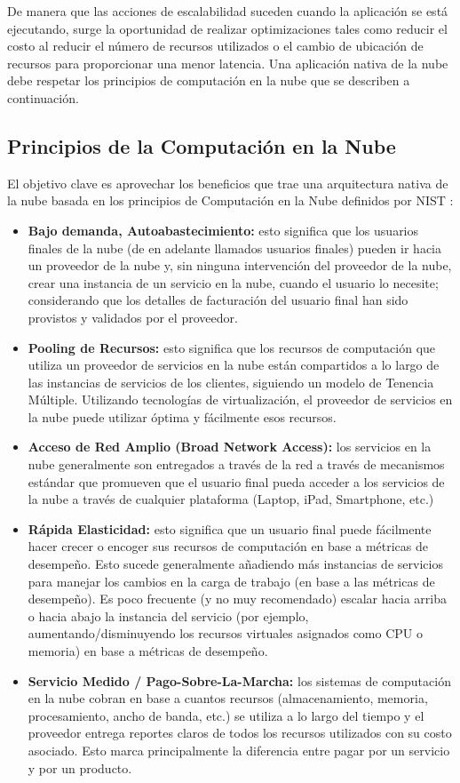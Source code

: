    De manera que las acciones de escalabilidad suceden cuando la aplicación se está ejecutando, surge la oportunidad de realizar optimizaciones tales como reducir el costo al reducir el número de recursos utilizados o el cambio de ubicación de recursos para proporcionar una menor latencia. Una aplicación nativa de la nube debe respetar los principios de computación en la nube que se describen a continuación.
	
        \subsection{Principios de la Computación en la Nube}
        El objetivo clave es aprovechar los beneficios que trae una arquitectura nativa de la nube basada en los principios de Computación en la Nube definidos por NIST \cite{Mell2011-wz}:
        \begin{itemize}
            \item \textbf{Bajo demanda, Autoabastecimiento:} esto significa que los usuarios finales de la nube (de en adelante llamados usuarios finales) pueden ir hacia un proveedor de la nube y, sin ninguna intervención del proveedor de la nube, crear una instancia de un servicio en la nube,  cuando el usuario lo necesite; considerando que los detalles de facturación del usuario final han sido provistos y validados por el proveedor.
            \item \textbf{Pooling de Recursos:} esto significa que los recursos de computación que utiliza un proveedor de servicios en la nube están compartidos a lo largo de las instancias de servicios de los clientes, siguiendo un modelo de Tenencia Múltiple. Utilizando tecnologías de virtualización, el proveedor de servicios en la nube puede utilizar óptima y fácilmente esos recursos. 
            \item \textbf{Acceso de Red Amplio (Broad Network Access):} los servicios en la nube generalmente son entregados a través de la red a través de mecanismos estándar que promueven que el usuario final pueda acceder a los servicios de la nube a través de cualquier plataforma (Laptop, iPad, Smartphone, etc.)
            \item \textbf{Rápida Elasticidad:} esto significa que un usuario final puede fácilmente hacer crecer o encoger sus recursos de computación en base a métricas de desempeño. Esto sucede generalmente añadiendo más instancias de servicios para manejar los cambios en la carga de trabajo (en base a las métricas de desempeño). Es poco frecuente (y no muy recomendado) escalar hacia arriba o hacia abajo la instancia del servicio (por ejemplo, aumentando/disminuyendo los recursos virtuales asignados como CPU o memoria) en base a métricas de desempeño.
            \item \textbf{Servicio Medido / Pago-Sobre-La-Marcha:}  los sistemas de computación en la nube cobran en base a cuantos recursos (almacenamiento, memoria, procesamiento, ancho de banda, etc.) se utiliza a lo largo del tiempo y el proveedor entrega reportes claros de todos los recursos utilizados con su costo asociado. Esto marca principalmente la diferencia entre pagar por un servicio y por un producto.
        \end{itemize}
        
